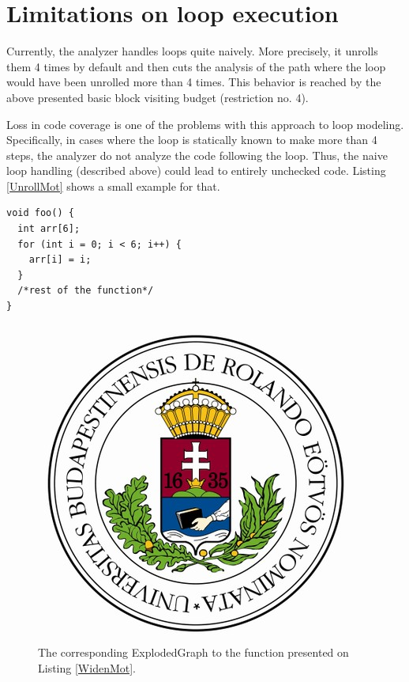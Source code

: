 
\section{Limitations on loop execution}
Currently, the analyzer handles loops quite naively. More precisely, it unrolls 
them 4 times by default and then cuts the analysis of the path where the loop 
would have been unrolled more than 4 times. This behavior is reached by the 
above presented basic block visiting budget (restriction no. 4).

Loss in code coverage is one of the problems with this approach to loop
modeling. Specifically, in cases where the loop is statically known to make 
more than 4 steps, the analyzer do not analyze the code following the loop. 
Thus, the naive loop handling (described above) could lead to entirely 
unchecked code.
Listing \ref{UnrollMot} shows a small example for that.

\begin{lstlisting}
void foo() {
  int arr[6];
  for (int i = 0; i < 6; i++) {
    arr[i] = i;
  }
  /*rest of the function*/
}\end{lstlisting}

\begin{figure}[h]
	\centering
	\includegraphics[scale=0.3]{img/elte-cimer}
	\caption{The corresponding ExplodedGraph to the function presented on 
		Listing \ref{WidenMot}.}
	\label{fig:eg_mot_0}
\end{figure}

